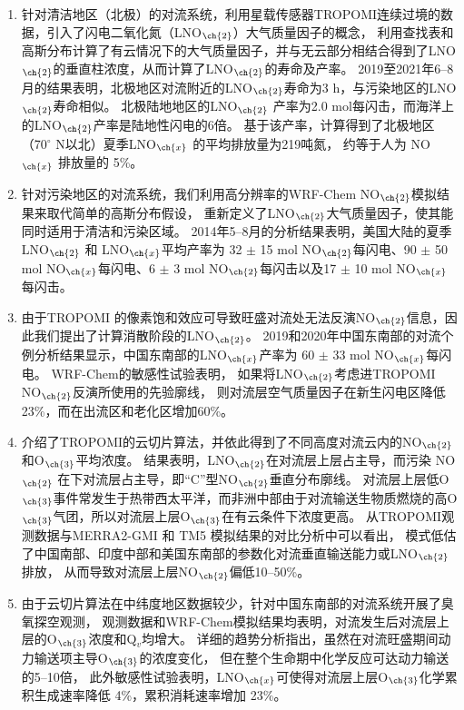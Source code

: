 \begin{enumerate}[label=（\arabic*）, labelindent=\parindent, nosep, leftmargin=0pt, widest=0, itemindent=*, topsep=0pt, partopsep=0pt, parsep=0pt]

\item 针对清洁地区（北极）的对流系统，利用星载传感器TROPOMI连续过境的数据，引入了闪电二氧化氮（LNO$_{\ch{2}}$）大气质量因子的概念，
利用查找表和高斯分布计算了有云情况下的大气质量因子，并与无云部分相结合得到了LNO$_{\ch{2}}$的垂直柱浓度，从而计算了LNO$_{\ch{2}}$的寿命及产率。
2019至2021年6--8月的结果表明，北极地区对流附近的LNO$_{\ch{2}}$寿命为3 h，与污染地区的LNO$_{\ch{2}}$寿命相似。
北极陆地地区的LNO$_{\ch{2}}$ 产率为2.0 mol每闪击，而海洋上的LNO$_{\ch{2}}$产率是陆地性闪电的6倍。
基于该产率，计算得到了北极地区（70$^{\circ}$ N以北）夏季LNO$_{\ch{x}}$ 的平均排放量为219吨氮，
约等于人为 NO$_{\ch{x}}$ 排放量的 5\%。

\item 针对污染地区的对流系统，我们利用高分辨率的WRF-Chem NO$_{\ch{2}}$模拟结果来取代简单的高斯分布假设，
重新定义了LNO$_{\ch{2}}$大气质量因子，使其能同时适用于清洁和污染区域。
2014年5--8月的分析结果表明，美国大陆的夏季 LNO$_{\ch{2}}$ 和 LNO$_{\ch{x}}$平均产率为
32 $\pm$ 15 mol NO$_{\ch{2}}$每闪电、90 $\pm$ 50 mol NO$_{\ch{x}}$每闪电、6 $\pm$ 3 mol NO$_{\ch{2}}$每闪击以及17 $\pm$ 10 mol NO$_{\ch{x}}$每闪击。

\item 由于TROPOMI 的像素饱和效应可导致旺盛对流处无法反演NO$_{\ch{2}}$信息，因此我们提出了计算消散阶段的LNO$_{\ch{2}}$。
2019和2020年中国东南部的对流个例分析结果显示，中国东南部的LNO$_{\ch{x}}$产率为 60 $\pm$ 33 mol NO$_{\ch{x}}$每闪电。
WRF-Chem的敏感性试验表明，
如果将LNO$_{\ch{2}}$考虑进TROPOMI NO$_{\ch{2}}$反演所使用的先验廓线，
则对流层空气质量因子在新生闪电区降低23\%，而在出流区和老化区增加60\%。

\item 介绍了TROPOMI的云切片算法，并依此得到了不同高度对流云内的NO$_{\ch{2}}$和O$_{\ch{3}}$平均浓度。
结果表明，LNO$_{\ch{2}}$在对流层上层占主导，而污染 NO$_{\ch{2}}$ 在下对流层占主导，即“C”型NO$_{\ch{2}}$垂直分布廓线。
对流层上层低O$_{\ch{3}}$事件常发生于热带西太平洋，而非洲中部由于对流输送生物质燃烧的高O$_{\ch{3}}$气团，所以对流层上层O$_{\ch{3}}$在有云条件下浓度更高。
从TROPOMI观测数据与MERRA2-GMI 和 TM5 模拟结果的对比分析中可以看出，
模式低估了中国南部、印度中部和美国东南部的参数化对流垂直输送能力或LNO$_{\ch{2}}$排放，
从而导致对流层上层NO$_{\ch{2}}$偏低10--50\%。

\item 由于云切片算法在中纬度地区数据较少，针对中国东南部的对流系统开展了臭氧探空观测，
观测数据和WRF-Chem模拟结果均表明，对流发生后对流层上层的O$_{\ch{3}}$浓度和Q$_v$均增大。
详细的趋势分析指出，虽然在对流旺盛期间动力输送项主导O$_{\ch{3}}$的浓度变化，
但在整个生命期中化学反应可达动力输送的5--10倍，
此外敏感性试验表明，LNO$_{\ch{x}}$可使得对流层上层O$_{\ch{3}}$化学累积生成速率降低 4\%，累积消耗速率增加 23\%。

\end{enumerate}

